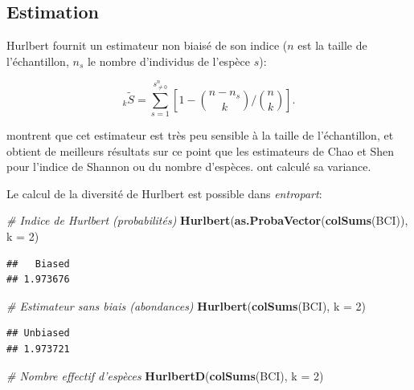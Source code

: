 \documentclass[
  11pt,
  french,
  a4paper,
  extrafontsizes,onecolumn,openright
  ]{memoir}
\newenvironment{Shaded}{\begin{snugshade}}{\end{snugshade}}
\newcommand{\CommentTok}[1]{\textcolor[rgb]{0.56,0.35,0.01}{\textit{#1}}}
\newcommand{\DataTypeTok}[1]{\textcolor[rgb]{0.13,0.29,0.53}{#1}}
\newcommand{\DecValTok}[1]{\textcolor[rgb]{0.00,0.00,0.81}{#1}}
\newcommand{\KeywordTok}[1]{\textcolor[rgb]{0.13,0.29,0.53}{\textbf{#1}}}
\newcommand{\NormalTok}[1]{#1}
\begin{document}
\hypertarget{estimation-1}{%
\subsection{Estimation}\label{estimation-1}}

Hurlbert fournit un estimateur non biaisé de son indice (\(n\) est la taille de l'échantillon, \(n_s\) le nombre d'individus de l'espèce \(s\)):

\begin{equation}
  \label{eq:EstHurlbert}
  _k{\tilde{S}}
  = \sum_{s=1}^{s^{n}_{\ne 0}}{\left[1-{\binom{n-n_s}{k}}/{\binom{n}{k}}\right]}.
\end{equation}

\textcite{Dauby2012} montrent que cet estimateur est très peu sensible à la taille de l'échantillon, et obtient de meilleurs résultats sur ce point que les estimateurs de Chao et Shen pour l'indice de Shannon ou du nombre d'espèces.
\textcite{Smith1977} ont calculé sa variance.

Le calcul de la diversité de Hurlbert est possible dans \emph{entropart}:

\scriptsize

\begin{Shaded}
\begin{Highlighting}[]
\CommentTok{# Indice de Hurlbert (probabilités)}
\KeywordTok{Hurlbert}\NormalTok{(}\KeywordTok{as.ProbaVector}\NormalTok{(}\KeywordTok{colSums}\NormalTok{(BCI)), }\DataTypeTok{k =} \DecValTok{2}\NormalTok{)}
\end{Highlighting}
\end{Shaded}

\begin{verbatim}
##   Biased 
## 1.973676
\end{verbatim}

\begin{Shaded}
\begin{Highlighting}[]
\CommentTok{# Estimateur sans biais (abondances)}
\KeywordTok{Hurlbert}\NormalTok{(}\KeywordTok{colSums}\NormalTok{(BCI), }\DataTypeTok{k =} \DecValTok{2}\NormalTok{)}
\end{Highlighting}
\end{Shaded}

\begin{verbatim}
## Unbiased 
## 1.973721
\end{verbatim}

\begin{Shaded}
\begin{Highlighting}[]
\CommentTok{# Nombre effectif d'espèces}
\KeywordTok{HurlbertD}\NormalTok{(}\KeywordTok{colSums}\NormalTok{(BCI), }\DataTypeTok{k =} \DecValTok{2}\NormalTok{)}
\end{Highlighting}
\end{Shaded}
\end{document}
